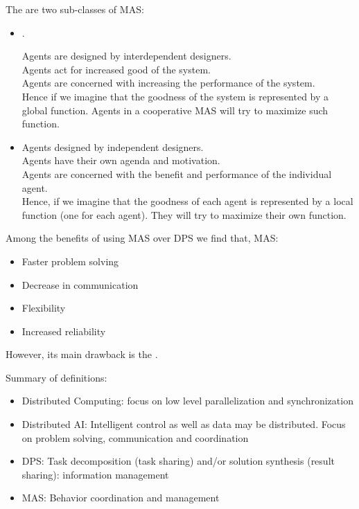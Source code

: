 The are two sub-classes of MAS:
\begin{itemize}
\item {}.

Agents are designed by interdependent designers.\\
Agents act for increased good of the system.\\
Agents are concerned with increasing the performance of the system.\\

Hence if we imagine that the goodness of the system is represented by a global function. Agents in a cooperative MAS will try to maximize such function.
\item {}

Agents designed by independent designers.\\
Agents have their own agenda and motivation.\\
Agents are concerned with the benefit and performance of the individual agent.\\

Hence, if we imagine that the goodness of each agent is represented by a local function (one for each agent). They will try to maximize their own function.	
\end{itemize}

Among the benefits of using MAS over DPS we find that, MAS:
\begin{itemize}
\item  Faster problem solving
\item Decrease in communication
\item  Flexibility
\item Increased reliability
\end{itemize}
However, its main drawback is the .

\vfill
Summary of definitions:
\begin{itemize}
\item Distributed Computing: focus on low level parallelization and synchronization
\item Distributed AI: Intelligent control as well as data may be distributed. Focus on problem solving, communication and coordination
\item DPS: Task decomposition (task sharing) and/or solution synthesis (result sharing): information management
\item MAS: Behavior coordination and management
\end{itemize}
\newpage


